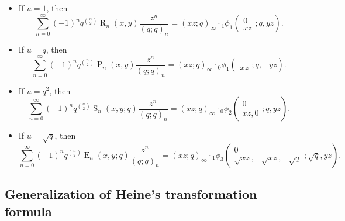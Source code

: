 \documentclass{cimart}
\DeclareMathOperator{\opE}{E}
\DeclareMathOperator{\opP}{P}
\DeclareMathOperator{\opR}{R}
\DeclareMathOperator{\opS}{S}
\begin{document}
\begin{itemize}
    \item If $u=1$, then
\begin{equation}
    \sum_{n=0}^{\infty}(-1)^nq^{\binom{n}{2}}\opR_{n}(x,y)\frac{z^n}{(q;q)_{n}}=(xz;q)_{\infty}\cdot{}_{1}\phi_{1}\left(
        \begin{array}{c}
             0 \\
             xz
        \end{array};
        q,yz
        \right).
\end{equation}
\item If $u=q$, then
\begin{equation}
    \sum_{n=0}^{\infty}(-1)^nq^{\binom{n}{2}}\opP_{n}(x,y)\frac{z^n}{(q;q)_{n}}=(xz;q)_{\infty}\cdot{}_{0}\phi_{1}\left(
        \begin{array}{c}
             - \\
             xz
        \end{array};
        q,-yz
        \right).
\end{equation}
\item If $u=q^2$, then
\begin{equation}
    \sum_{n=0}^{\infty}(-1)^nq^{\binom{n}{2}}\opS_{n}(x,y;q)\frac{z^n}{(q;q)_{n}}=(xz;q)_{\infty}\cdot{}_{0}\phi_{2}\left(
        \begin{array}{c}
             0 \\
             xz,0
        \end{array};
        q,yz
        \right).
\end{equation}
\item If $u=\sqrt{q}$, then
\begin{equation}
    \sum_{n=0}^{\infty}(-1)^nq^{\binom{n}{2}}\opE_{n}(x,y;q)\frac{z^n}{(q;q)_{n}}=(xz;q)_{\infty}\cdot{}_{1}\phi_{3}\left(
        \begin{array}{c}
             0 \\
             \sqrt{xz},-\sqrt{xz},-\sqrt{q}
        \end{array};
        \sqrt{q},yz
        \right).
\end{equation}
\end{itemize}

\subsection{Generalization of Heine's transformation formula}
\end{document}
